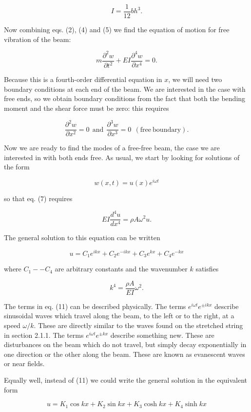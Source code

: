   $$I=\dfrac{1}{12} bh^3. \tag{6}$$ 

  Now combining eqs. (2), (4) and (5) we find the equation of motion for free 
  vibration of the beam: 

  $$m \dfrac{\partial^2 w}{\partial t^2}+EI \dfrac{\partial^4 w}{\partial 
  x^4}=0 . \tag{7}$$ 

  Because this is a fourth-order differential equation in $x$, we will need two 
  boundary conditions at each end of the beam. We are interested in the case 
  with free ends, so we obtain boundary conditions from the fact that both the 
  bending moment and the shear force must be zero: this requires 

  $$\dfrac{\partial^2 w}{\partial x^2}=0 \mathrm{~~and~~} \dfrac{\partial^3 
  w}{\partial x^3}=0~~\mathrm{(free~boundary).} \tag{8}$$ 

  Now we are ready to find the modes of a free-free beam, the case we are 
  interested in with both ends free. As usual, we start by looking for 
  solutions of the form 

  $$w(x,t) = u(x) e^{i \omega t} \tag{9}$$ 

  so that eq. (7) requires 

  $$EI\dfrac{d^4 u}{d x^4}= \rho A \omega^2 u. \tag{10}$$ 

  The general solution to this equation can be written 

  $$u=C_1 e^{ikx} + C_2 e^{-ikx} + C_3 e^{kx} + C_4 e^{-kx} \tag{11}$$ 

  where $C_1 -- C_4$ are arbitrary constants and the wavenumber $k$ satisfies 

  $$k^4 = \dfrac{\rho A}{EI}\omega^2 . \tag{12}$$ 

  The terms in eq. (11) can be described physically. The terms $e^{i \omega t} 
  e^{\pm i k x}$ describe sinusoidal waves which travel along the beam, to the 
  left or to the right, at a speed $\omega/k$. These are directly similar to 
  the waves found on the stretched string in section 2.1.1. The terms $e^{i 
  \omega t} e^{\pm k x}$ describe something new. These are disturbances on the 
  beam which do not travel, but simply decay exponentially in one direction or 
  the other along the beam. These are known as evanescent waves or near fields. 

  Equally well, instead of (11) we could write the general solution in the 
  equivalent form 

  $$u=K_1 \cos kx + K_2 \sin kx + K_3 \cosh kx + K_4 \sinh kx \tag{13}$$ 

